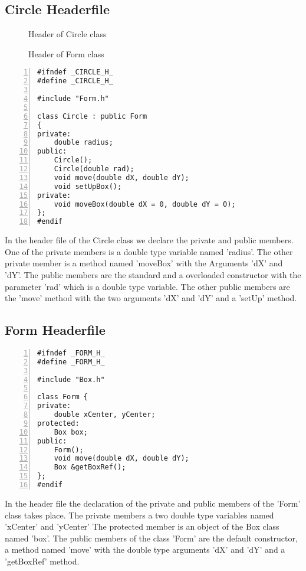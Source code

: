 \documentclass{article}
\begin{document}
\subsection{Circle Headerfile}
\begin{figure}
\scriptsize{\caption{Header of Circle class}}
\scriptsize{\caption{Header of Form class}}
\end{figure}
\begin{lstlisting}[basicstyle=\footnotesize\ttfamily, numbers=left, stepnumber=1, numberstyle = \normalsize]
#ifndef _CIRCLE_H_
#define _CIRCLE_H_

#include "Form.h"

class Circle : public Form
{
private: 
	double radius; 
public:
	Circle();
	Circle(double rad);
	void move(double dX, double dY);
	void setUpBox();
private:
	void moveBox(double dX = 0, double dY = 0);
};
#endif
\end{lstlisting}
\normalsize{In the header file of the Circle class we declare the private and public members. One of the private members is a double type variable named 'radius'. The other private member is a method named 'moveBox' with the Arguments 'dX' and 'dY'. The public members are the standard and a overloaded constructor with the parameter 'rad' which is a double type variable. The other public members are the 'move' method with the two arguments 'dX' and 'dY' and a 'setUp' method.}

\subsection{Form Headerfile}
\begin{lstlisting}[basicstyle=\footnotesize\ttfamily, numbers=left, stepnumber=1, numberstyle = \normalsize]
#ifndef _FORM_H_
#define _FORM_H_

#include "Box.h"

class Form {
private:
	double xCenter, yCenter;  
protected:	
	Box box; 	
public:
	Form();
	void move(double dX, double dY);	
	Box &getBoxRef();
};
#endif
\end{lstlisting}
\normalsize{In the header file the declaration of the private and public members of the 'Form' class takes place. The private members a two double type variables named 'xCenter' and 'yCenter' The protected member is an object of the Box class named 'box'. The public members of the class 'Form' are the default constructor, a method named 'move' with the double type arguments 'dX' and 'dY' and a 'getBoxRef' method.
}
\end{document}
